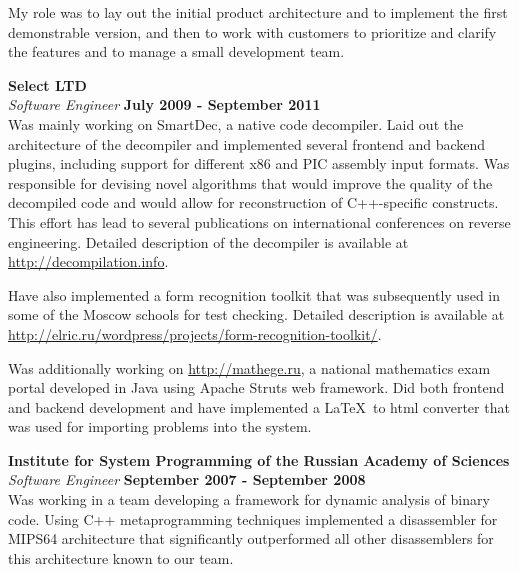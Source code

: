 \documentclass[margin,line]{CV}
\begin{document}
\begin{resume}
    My role was to lay out the initial product architecture and to implement the first demonstrable version, and then to work with customers to prioritize and clarify the features and to manage a small development team. 
    

    
    \textbf{Select LTD} \vspace{2mm}\\\vspace{1mm}%
    \textsl{Software Engineer} \hfill \textbf{July 2009 - September 2011}\\
    Was mainly working on SmartDec, a native code decompiler. Laid out the architecture of the decompiler and implemented several frontend and backend plugins, including support for different x86 and PIC assembly input formats. Was responsible for devising novel algorithms that would improve the quality of the decompiled code and would allow for reconstruction of C++-specific constructs. This effort has lead to several publications on international conferences on reverse engineering. Detailed description of the decompiler is available at \url{http://decompilation.info}.
    
    Have also implemented a form recognition toolkit that was subsequently used in some of the Moscow schools for test checking. Detailed description is available at \url{http://elric.ru/wordpress/projects/form-recognition-toolkit/}. 

    Was additionally working on \url{http://mathege.ru}, a national mathematics exam portal developed in Java using Apache Struts web framework. Did both frontend and backend development and have implemented a \LaTeX~to html converter that was used for importing problems into the system.

    
    \textbf{Institute for System Programming of the Russian Academy of Sciences} \vspace{2mm}\\\vspace{1mm}%
    \textsl{Software Engineer} \hfill \textbf{September 2007 - September 2008}\\
    Was working in a team developing a framework for dynamic analysis of binary code. Using C++ metaprogramming techniques implemented a disassembler for MIPS64 architecture that significantly outperformed all other disassemblers for this architecture known to our team.


\end{resume}
\end{document}
